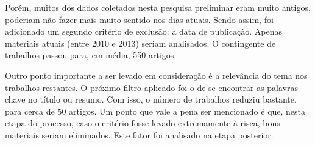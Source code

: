 			Porém, muitos dos dados coletados nesta pesquisa preliminar eram muito antigos, poderiam não fazer mais muito sentido nos dias atuais. Sendo assim, foi adicionado um segundo critério de exclusão: a data de publicação. Apenas materiais atuais (entre 2010 e 2013) seriam analisados. O contingente de trabalhos passou para, em média, 550 artigos.

			Outro ponto importante a ser levado em consideração é a relevância do tema nos trabalhos restantes. O próximo filtro aplicado foi o de se encontrar as palavras-chave no título ou resumo. Com isso, o número de trabalhos reduziu bastante, para cerca de 50 artigos. Um ponto que vale a pena ser mencionado é que, nesta etapa do processo, caso o critério fosse levado extremamente à risca, bons materiais seriam eliminados. Este fator foi analisado na etapa posterior.

